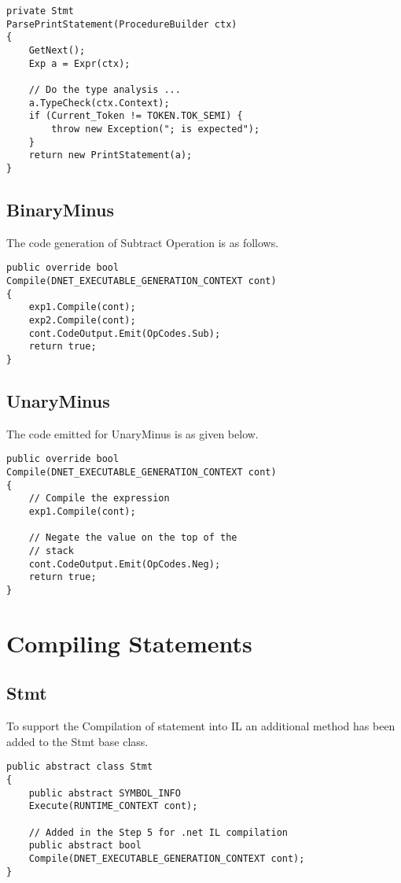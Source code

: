\lstset{style=csharp}
\begin{lstlisting}
private Stmt 
ParsePrintStatement(ProcedureBuilder ctx)
{
	GetNext();
	Exp a = Expr(ctx);
	
	// Do the type analysis ...
	a.TypeCheck(ctx.Context);
	if (Current_Token != TOKEN.TOK_SEMI) {
		throw new Exception("; is expected");
	}
	return new PrintStatement(a);
}
\end{lstlisting}

\subsection{BinaryMinus}
The code generation of Subtract Operation is as follows.

\lstset{style=csharp}
\begin{lstlisting}
public override bool 
Compile(DNET_EXECUTABLE_GENERATION_CONTEXT cont)
{
	exp1.Compile(cont);
	exp2.Compile(cont);
	cont.CodeOutput.Emit(OpCodes.Sub);
	return true;
}
\end{lstlisting}

\subsection{UnaryMinus}
The code emitted for UnaryMinus is as given below.

\lstset{style=csharp}
\begin{lstlisting}
public override bool 
Compile(DNET_EXECUTABLE_GENERATION_CONTEXT cont)
{
	// Compile the expression
	exp1.Compile(cont);
	
	// Negate the value on the top of the
	// stack
	cont.CodeOutput.Emit(OpCodes.Neg);
	return true;
}
\end{lstlisting}
\section{Compiling Statements}
\subsection{Stmt}
To support the Compilation of statement into IL an additional method has been added to the Stmt base class.
\lstset{style=csharp}
\begin{lstlisting}
public abstract class Stmt
{
	public abstract SYMBOL_INFO 
	Execute(RUNTIME_CONTEXT cont);

	// Added in the Step 5 for .net IL compilation
	public abstract bool 
	Compile(DNET_EXECUTABLE_GENERATION_CONTEXT cont);
}
\end{lstlisting}
